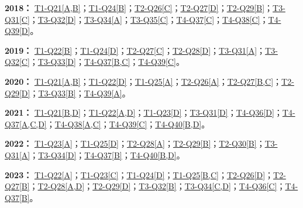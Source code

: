 \documentclass[11pt,a4paper]{article}
\begin{document}
\noindent\textbf{2018：} \hyperref[idx-2018-T1-Q21]{T1-Q21[A,B]}；\hyperref[idx-2018-T1-Q24]{T1-Q24[B]}；\hyperref[idx-2018-T2-Q26]{T2-Q26[C]}；\hyperref[idx-2018-T2-Q27]{T2-Q27[D]}；\hyperref[idx-2018-T2-Q29]{T2-Q29[B]}；\hyperref[idx-2018-T3-Q31]{T3-Q31[C]}；\hyperref[idx-2018-T3-Q32]{T3-Q32[D]}；\hyperref[idx-2018-T3-Q34]{T3-Q34[A]}；\hyperref[idx-2018-T3-Q35]{T3-Q35[C]}；\hyperref[idx-2018-T4-Q37]{T4-Q37[C]}；\hyperref[idx-2018-T4-Q38]{T4-Q38[C]}；\hyperref[idx-2018-T4-Q39]{T4-Q39[D]}。\par\smallskip
\noindent\textbf{2019：} \hyperref[idx-2019-T1-Q22]{T1-Q22[B]}；\hyperref[idx-2019-T1-Q24]{T1-Q24[D]}；\hyperref[idx-2019-T2-Q27]{T2-Q27[C]}；\hyperref[idx-2019-T2-Q28]{T2-Q28[D]}；\hyperref[idx-2019-T3-Q31]{T3-Q31[A]}；\hyperref[idx-2019-T3-Q32]{T3-Q32[C]}；\hyperref[idx-2019-T3-Q33]{T3-Q33[D]}；\hyperref[idx-2019-T4-Q37]{T4-Q37[B,C]}；\hyperref[idx-2019-T4-Q39]{T4-Q39[C]}。\par\smallskip
\noindent\textbf{2020：} \hyperref[idx-2020-T1-Q21]{T1-Q21[A,B]}；\hyperref[idx-2020-T1-Q22]{T1-Q22[D]}；\hyperref[idx-2020-T1-Q25]{T1-Q25[A]}；\hyperref[idx-2020-T2-Q26]{T2-Q26[A]}；\hyperref[idx-2020-T2-Q27]{T2-Q27[B,C]}；\hyperref[idx-2020-T2-Q29]{T2-Q29[D]}；\hyperref[idx-2020-T3-Q33]{T3-Q33[B]}；\hyperref[idx-2020-T4-Q39]{T4-Q39[A]}。\par\smallskip
\noindent\textbf{2021：} \hyperref[idx-2021-T1-Q21]{T1-Q21[B,D]}；\hyperref[idx-2021-T1-Q22]{T1-Q22[A,D]}；\hyperref[idx-2021-T1-Q23]{T1-Q23[D]}；\hyperref[idx-2021-T3-Q31]{T3-Q31[D]}；\hyperref[idx-2021-T4-Q36]{T4-Q36[D]}；\hyperref[idx-2021-T4-Q37]{T4-Q37[A,C,D]}；\hyperref[idx-2021-T4-Q38]{T4-Q38[A,C]}；\hyperref[idx-2021-T4-Q39]{T4-Q39[C]}；\hyperref[idx-2021-T4-Q40]{T4-Q40[B,D]}。\par\smallskip
\noindent\textbf{2022：} \hyperref[idx-2022-T1-Q23]{T1-Q23[A]}；\hyperref[idx-2022-T1-Q25]{T1-Q25[D]}；\hyperref[idx-2022-T2-Q28]{T2-Q28[A]}；\hyperref[idx-2022-T2-Q29]{T2-Q29[B]}；\hyperref[idx-2022-T2-Q30]{T2-Q30[B]}；\hyperref[idx-2022-T3-Q31]{T3-Q31[A]}；\hyperref[idx-2022-T3-Q34]{T3-Q34[D]}；\hyperref[idx-2022-T4-Q37]{T4-Q37[B]}；\hyperref[idx-2022-T4-Q40]{T4-Q40[B,D]}。\par\smallskip
\noindent\textbf{2023：} \hyperref[idx-2023-T1-Q22]{T1-Q22[A]}；\hyperref[idx-2023-T1-Q23]{T1-Q23[C]}；\hyperref[idx-2023-T1-Q24]{T1-Q24[D]}；\hyperref[idx-2023-T1-Q25]{T1-Q25[B,C]}；\hyperref[idx-2023-T2-Q26]{T2-Q26[D]}；\hyperref[idx-2023-T2-Q27]{T2-Q27[B]}；\hyperref[idx-2023-T2-Q28]{T2-Q28[A,D]}；\hyperref[idx-2023-T2-Q29]{T2-Q29[D]}；\hyperref[idx-2023-T3-Q32]{T3-Q32[B]}；\hyperref[idx-2023-T3-Q34]{T3-Q34[C,D]}；\hyperref[idx-2023-T4-Q36]{T4-Q36[C]}；\hyperref[idx-2023-T4-Q37]{T4-Q37[B]}。\par\smallskip
\end{document}
